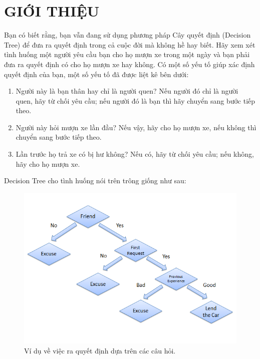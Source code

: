 \chapter {GIỚI THIỆU}

Bạn có biết rằng, bạn vẫn đang sử dụng phương pháp Cây quyết định (Decision Tree) để đưa ra quyết định trong cả cuộc đời mà không hề hay biết. Hãy xem xét tình huống một người yêu cầu bạn cho họ mượn xe trong một ngày và bạn phải đưa ra quyết định có cho họ mượn xe hay không. Có một số yếu tố giúp xác định quyết định của bạn, một số yếu tố đã được liệt kê bên dưới:

\begin{enumerate}
    \item Người này là bạn thân hay chỉ là người quen? Nếu người đó chỉ là người quen, hãy từ chối yêu cầu; nếu người đó là bạn thì hãy chuyển sang bước tiếp theo.
    \item Người này hỏi mượn xe lần đầu? Nếu vậy, hãy cho họ mượn xe, nếu không thì chuyển sang bước tiếp theo.
    \item Lần trước họ trả xe có bị hư không? Nếu có, hãy từ chối yêu cầu; nếu không, hãy cho họ mượn xe.
\end{enumerate}

Decision Tree cho tình huống nói trên trông giống như sau:

\begin{center}
    \begin{figure}[h!]
        \begin{center}
         \includegraphics[scale=0.7]{chapter1/img/dt_ex1.png}
        \end{center}
        \caption{Ví dụ về việc ra quyết định dựa trên các câu hỏi.}
        \label{fig:dt_ex1}
    \end{figure}
\end{center}
